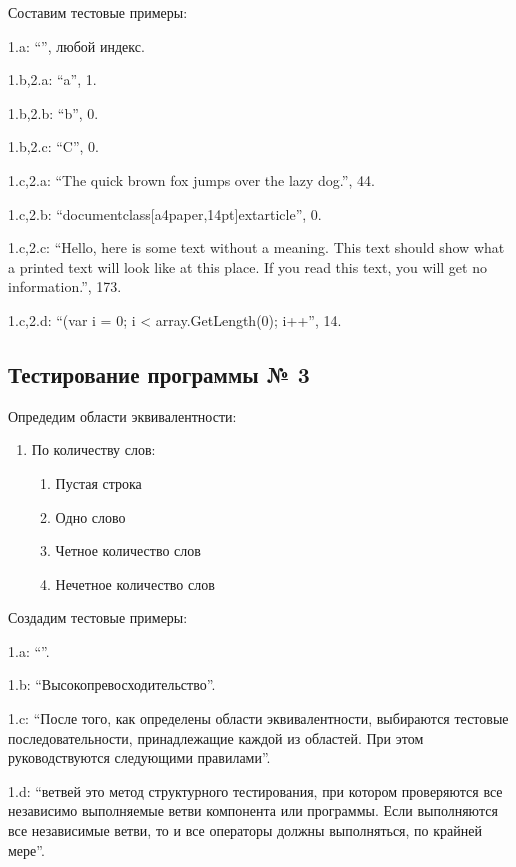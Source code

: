 \documentclass[a4paper,14pt]{extarticle}
\begin{document}
    Составим тестовые примеры:

    1.a: \enquote{}, любой индекс.
    
    1.b,2.a: \enquote{a}, 1.
    
    1.b,2.b: \enquote{b}, 0.

    1.b,2.c: \enquote{C}, 0.

    1.c,2.a: \enquote{The quick brown fox jumps over the lazy dog.}, 44.
    
    1.c,2.b: \enquote{documentclass[a4paper,14pt]{extarticle}}, 0.

    1.c,2.c: \enquote{Hello, here is some text without a meaning.  This text should show what a printed text will look like at this place.  If you read this text, you will get no information.}, 173.

    1.c,2.d: \enquote{(var i = 0; i < array.GetLength(0); i++}, 14.

    \subsection{Тестирование программы № 3}

    Опредедим области эквивалентности:
    \begin{enumerate}
        \item По количеству слов:
        \begin{enumerate}
            \item Пустая строка
            \item Одно слово
            \item Четное количество слов
            \item Нечетное количество слов
        \end{enumerate}
    \end{enumerate}

    Создадим тестовые примеры:

    1.a: \enquote{}.

    1.b: \enquote{Высокопревосходительство}.

    1.c: \enquote{После того, как определены области эквивалентности, выбираются
    тестовые последовательности, принадлежащие каждой из областей. При этом
    руководствуются следующими правилами}.

    1.d: \enquote{ветвей это метод структурного тестирования, при котором
    проверяются все независимо выполняемые ветви компонента или программы.
    Если выполняются все независимые ветви, то и все операторы должны
    выполняться, по крайней мере}.
\end{document}
